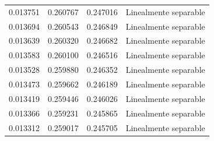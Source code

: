 \begin{tabular}{llll}
0.013751 & 0.260767 & 0.247016 & Linealmente separable \\
0.013694 & 0.260543 & 0.246849 & Linealmente separable \\
0.013639 & 0.260320 & 0.246682 & Linealmente separable \\
0.013583 & 0.260100 & 0.246516 & Linealmente separable \\
0.013528 & 0.259880 & 0.246352 & Linealmente separable \\
0.013473 & 0.259662 & 0.246189 & Linealmente separable \\
0.013419 & 0.259446 & 0.246026 & Linealmente separable \\
0.013366 & 0.259231 & 0.245865 & Linealmente separable \\
0.013312 & 0.259017 & 0.245705 & Linealmente separable \\
\bottomrule
\end{tabular}

